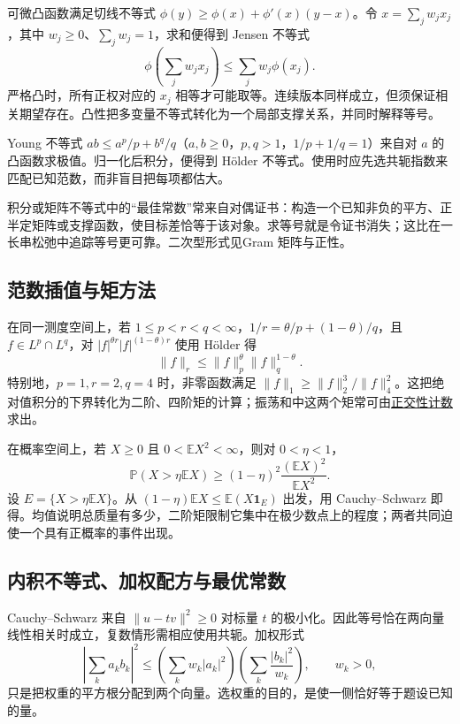 \documentclass[UTF8,12pt,a4paper,fontset=fandol]{ctexart}
\begin{document}
\label{app:estimate-convexity}

可微凸函数满足切线不等式 $\phi(y)\geq\phi(x)+\phi'(x)(y-x)$。令 $x=\sum_jw_jx_j$，其中 $w_j\geq0$、$\sum_jw_j=1$，求和便得到 Jensen 不等式
\[
\phi\!\left(\sum_jw_jx_j\right)\leq\sum_jw_j\phi(x_j).
\]
严格凸时，所有正权对应的 $x_j$ 相等才可能取等。连续版本同样成立，但须保证相关期望存在。凸性把多变量不等式转化为一个局部支撑关系，并同时解释等号。

Young 不等式 $ab\leq a^p/p+b^q/q$（$a,b\geq0$，$p,q>1$，$1/p+1/q=1$）来自对 $a$ 的凸函数求极值。归一化后积分，便得到 Hölder 不等式。使用时应先选共轭指数来匹配已知范数，而非盲目把每项都估大。

积分或矩阵不等式中的“最佳常数”常来自对偶证书：构造一个已知非负的平方、正半定矩阵或支撑函数，使目标差恰等于该对象。求等号就是令证书消失；这比在一长串松弛中追踪等号更可靠。二次型形式见Gram 矩阵与正性。

\subsection{范数插值与矩方法}

\label{app:estimate-moments}

在同一测度空间上，若 $1\leq p<r<q<\infty$，$1/r=\theta/p+(1-\theta)/q$，且 $f\in L^p\cap L^q$，对 $|f|^{\theta r}|f|^{(1-\theta)r}$ 使用 Hölder 得
\[
\|f\|_r\leq\|f\|_p^\theta\|f\|_q^{1-\theta}.
\]
特别地，$p=1,r=2,q=4$ 时，非零函数满足 $\|f\|_1\geq\|f\|_2^3/\|f\|_4^2$。这把绝对值积分的下界转化为二阶、四阶矩的计算；振荡和中这两个矩常可由\hyperref[app:integration-fourier]{正交性计数}求出。

在概率空间上，若 $X\geq0$ 且 $0<\mathbb EX^2<\infty$，则对 $0<\eta<1$，
\[
\mathbb P(X>\eta\mathbb EX)\geq(1-\eta)^2\frac{(\mathbb EX)^2}{\mathbb EX^2}.
\]
设 $E=\{X>\eta\mathbb EX\}$。从 $(1-\eta)\mathbb EX\leq\mathbb E(X\mathbf1_E)$ 出发，用 Cauchy--Schwarz 即得。均值说明总质量有多少，二阶矩限制它集中在极少数点上的程度；两者共同迫使一个具有正概率的事件出现。

\subsection{内积不等式、加权配方与最优常数}

\label{app:inequality-cauchy}

Cauchy--Schwarz 来自 $\|u-tv\|^2\geq0$ 对标量 $t$ 的极小化。因此等号恰在两向量线性相关时成立，复数情形需相应使用共轭。加权形式
\[
\left|\sum_ka_kb_k\right|^2
\leq\left(\sum_kw_k|a_k|^2\right)
\left(\sum_k\frac{|b_k|^2}{w_k}\right),\qquad w_k>0,
\]
只是把权重的平方根分配到两个向量。选权重的目的，是使一侧恰好等于题设已知的量。
\end{document}
